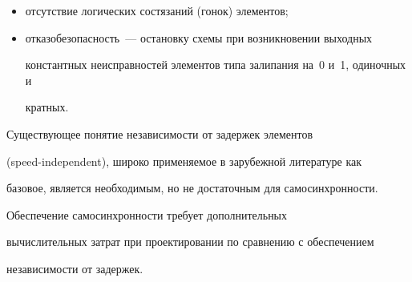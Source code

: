       \begin{itemize}


      \item отсутствие логических состязаний (гонок) элементов;\\[-14pt]


\item  отказобезопасность~--- остановку схемы при возникновении выходных 


константных неисправностей элементов типа залипания на~0 и~1, одиночных и 


кратных.


\end{itemize}





      Существующее понятие независимости от задержек элементов 


      (speed-independent), широко применяемое в зарубежной литературе как 


базовое,  является необходимым, но не достаточным для самосинхронности.


      


      Обеспечение самосинхронности требует дополнительных 


вычислительных затрат при проектировании по сравнению с обеспечением 


независимости от задержек.





